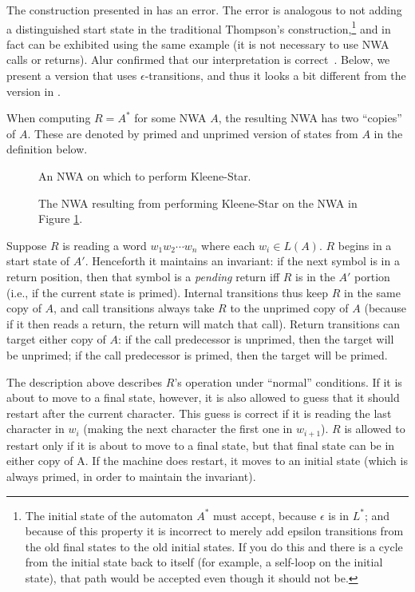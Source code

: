 The construction presented in \cite{JACM:AM2009} has an error. The error is
analogous to not adding a distinguished start state in the traditional
Thompson's construction,\footnote{The initial state of the automaton $A^*$
  must accept, because $\epsilon$ is in $L^*$; and because of this property it is
  incorrect to merely add epsilon transitions from the old final states to
  the old initial states. If you do this and there is a cycle from the
  initial state back to itself (for example, a self-loop on the initial
  state), that path would be accepted even though it should not be.} and in
fact can be exhibited using the same example (it is not necessary to use NWA
calls or returns). Alur confirmed that our interpretation is
correct~\cite{AlurNwaStarBroken}. Below, we present
a version that uses $\epsilon$-transitions, and thus it looks a bit
different from the version in \cite{JACM:AM2009}.

When computing $R = A^*$ for some
NWA $A$, the resulting NWA has two ``copies'' of $A$. These are denoted by
primed and unprimed version of states from $A$ in the definition below. 

\begin{figure}[p]
  \centering
  \caption{An NWA on which to perform Kleene-Star.}
  \label{Fi:Star1}
\end{figure}

\begin{figure}[p]
  \centering
  \caption{The NWA resulting from performing Kleene-Star on the NWA in Figure \ref{Fi:Star1}.}
  \label{Fi:Star2}
\end{figure}
\antistupidfloats


Suppose $R$ is reading a word $w_1w_2\cdots w_n$ where each $w_i \in
L(A)$. $R$ begins in a start state of $A'$. Henceforth it maintains an
invariant: if the next symbol is in a return position, then that symbol is a
\emph{pending} return iff $R$ is in the $A'$ portion (i.e., if the current state is
primed). Internal transitions thus keep $R$ in the same copy of $A$, and call
transitions always take $R$ to the unprimed copy of $A$ (because if it then
reads a return, the return will match that call). Return transitions can
target either copy of $A$: if the call predecessor is unprimed, then the
target will be unprimed; if the call predecessor is primed, then the target
will be primed.

The description above describes $R$'s operation under ``normal''
conditions. If it is about to move to a final state, however, it is also allowed to guess that it
should restart after the current character. This guess is correct if it is
reading the last character in $w_i$
(making the next character the first one in $w_{i+1}$). $R$ is allowed to
restart only if it is about to move to a final state, but that final state
can be in either copy of A. If the machine
does restart, it moves to an initial state (which is always primed, in order to
maintain the invariant).

